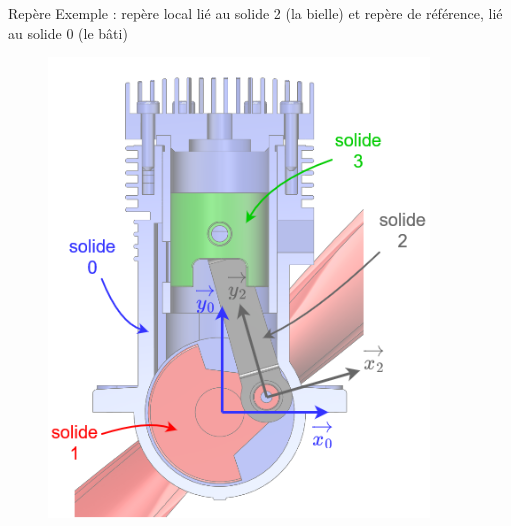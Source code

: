 \documentclass[
  ignorenonframetext,
  aspectratio=169,
  c]{beamer}
\begin{document}
\begin{frame}{Repère}
\label{repuxe8re-1}
Exemple : repère local lié au solide 2 (la bielle) et repère de
référence, lié au solide 0 (le bâti)

\begin{figure}

\begin{minipage}{0.50\linewidth}
\begin{center}
\includegraphics[width=0.9\textwidth,height=\textheight]{CM3/Repere-01.png}
\end{center}
\end{minipage}%
%
\begin{minipage}{0.50\linewidth}
\begin{center}

\end{center}
\end{minipage}
\end{figure}
\end{frame}
\end{document}
